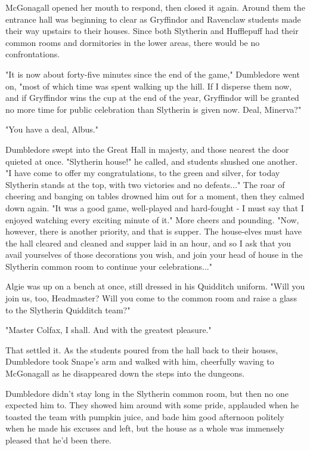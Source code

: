 McGonagall opened her mouth to respond, then closed it again. Around them the entrance hall was beginning to clear as Gryffindor and Ravenclaw students made their way upstairs to their houses. Since both Slytherin and Hufflepuff had their common rooms and dormitories in the lower areas, there would be no confrontations.

"It is now about forty-five minutes since the end of the game," Dumbledore went on, "most of which time was spent walking up the hill. If I disperse them now, and if Gryffindor wins the cup at the end of the year, Gryffindor will be granted no more time for public celebration than Slytherin is given now. Deal, Minerva?"

"You have a deal, Albus."

Dumbledore swept into the Great Hall in majesty, and those nearest the door quieted at once. "Slytherin house!" he called, and students shushed one another. "I have come to offer my congratulations, to the green and silver, for today Slytherin stands at the top, with two victories and no defeats..." The roar of cheering and banging on tables drowned him out for a moment, then they calmed down again. "It was a good game, well-played and hard-fought - I must say that I enjoyed watching every exciting minute of it." More cheers and pounding. "Now, however, there is another priority, and that is supper. The house-elves must have the hall cleared and cleaned and supper laid in an hour, and so I ask that you avail yourselves of those decorations you wish, and join your head of house in the Slytherin common room to continue your celebrations..."

Algie was up on a bench at once, still dressed in his Quidditch uniform. "Will you join us, too, Headmaster? Will you come to the common room and raise a glass to the Slytherin Quidditch team?"

"Master Colfax, I shall. And with the greatest pleasure."

That settled it. As the students poured from the hall back to their houses, Dumbledore took Snape's arm and walked with him, cheerfully waving to McGonagall as he disappeared down the steps into the dungeons.

Dumbledore didn't stay long in the Slytherin common room, but then no one expected him to. They showed him around with some pride, applauded when he toasted the team with pumpkin juice, and bade him good afternoon politely when he made his excuses and left, but the house as a whole was immensely pleased that he'd been there.

